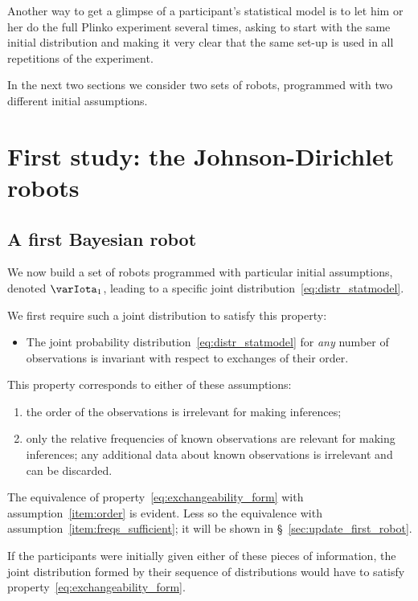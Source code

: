 \documentclass[\ifafour a4paper,12pt,\else a5paper,10pt,\fi%
onecolumn,oneside,article,%
british%
]{memoir}
\theoremstyle{remark}
\theoremstyle{innote}
\renewcommand*{\|}{\mathpunct{|}}
\newcommand*{\sect}{\S}%
\newcommand*{\yI}{\varIota}
\newcommand*{\yMJ}{\yI_1}
\begin{document}
Another way to get a glimpse of a participant's statistical model is to let
him or her do the full Plinko experiment several times, asking to start
with the same initial distribution and making it very clear that the same
set-up is used in all repetitions of the experiment.

In the next two sections we consider two sets of robots, programmed with two
different initial assumptions.

\section{First study: the Johnson-Dirichlet robots}
\label{sec:first_study}

\subsection{A first Bayesian robot}
\label{sec:bayes_robot}

We now build a set of robots programmed with particular initial
assumptions, denoted $\yMJ$, leading to a specific joint
distribution~\eqref{eq:distr_statmodel}.

We first require such a joint distribution to satisfy this property:
\begin{itemize}
\item The joint probability distribution~\eqref{eq:distr_statmodel} for
  \emph{any} number of observations is invariant with respect to exchanges
  of their order.
\end{itemize}
This property corresponds to either of these assumptions:
\begin{enumerate}[label=(\textit{\alph*})]
\item\label{item:order}the order of the observations is irrelevant for
  making inferences;
\item\label{item:freqs_sufficient}only the relative frequencies of known
  observations are relevant for making inferences; any additional data
  about known observations is irrelevant and can be discarded.
\end{enumerate}
The equivalence of property~\eqref{eq:exchangeability_form} with
assumption~\ref{item:order} is evident. Less so the equivalence with
assumption~\ref{item:freqs_sufficient}; it will be shown in
\sect~\ref{sec:update_first_robot}.

If the participants were initially given either of these pieces of
information, the joint distribution formed by their sequence of
distributions would have to satisfy
property~\eqref{eq:exchangeability_form}.
\end{document}
